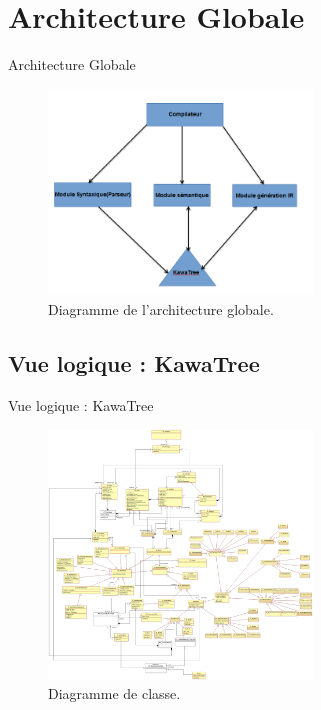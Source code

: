 \section{Architecture Globale}
    \begin{frame}{Architecture Globale}
      
        \begin{figure}[!h]
            \includegraphics[width=7cm]{img/archi.PNG}
            \caption{Diagramme de l'architecture globale.}
            \label{diagramme_de_l_architecture_globale}
        \end{figure}      
      
    \end{frame}

  \subsection{Vue logique : KawaTree}
    \begin{frame}{Vue logique : KawaTree}
      \begin{figure}[!h]
          \includegraphics[width=7cm]{img/Diagramme_KT_V3_1.png}
          \caption{Diagramme de classe.}
          \label{diagramme_de_classe}
        \end{figure}
    \end{frame}
    
